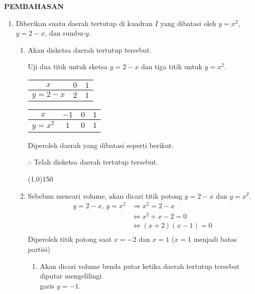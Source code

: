 \begin{center}
\textbf{\large{PEMBAHASAN}}
\end{center}
\begin{enumerate}[leftmargin=*, label={\arabic*}.]
\item Diberikan suatu daerah tertutup di kuadran $I$ yang dibatasi oleh $y=x^{2}$, 
$y=2-x$, dan sumbu-$y$.
    \begin{enumerate}[label={\alph*}.]
    \item Akan disketsa daerah tertutup tersebut.
    
    Uji dua titik untuk sketsa $y=2-x$ dan tiga titik untuk $y=x^2$.
    \begin{center}
        \begin{tabular}{|c|c|c|}\hline
            $x$  & $0$ & $1$ \\ \hline
            $y=2-x$ & $2$ & $1$ \\ \hline
        \end{tabular}\quad
        \begin{tabular}{|c|c|c|c|}\hline
            $x$ & $-1$ & $0$ & $1$ \\ \hline
            $y=x^{2}$ & $1$ & $0$ & $1$ \\ \hline
        \end{tabular}
    \end{center}
    Diperoleh daerah yang dibatasi seperti berikut.

    

    $\therefore$ Telah disketsa daerah tertutup tersebut.


\begin{center}\line(1,0){150}\end{center}


    \item Sebelum mencari volume, akan dicari titik potong $y=2-x$ dan $y=x^{2}$.
    \begin{align*}
        y=2-x,\,y=x^{2} &\Longrightarrow x^{2}=2-x\\
        &\iff x^{2}+x-2 = 0\\
        &\iff (x+2)(x-1) = 0\\
    \end{align*}
    Diperoleh titik potong saat $x=-2$ dan $x=1$ ($x=1$ menjadi batas partisi)
        \begin{enumerate}[label={\roman*}.]
        \item Akan dicari volume benda putar ketika daerah tertutup tersebut 
        diputar mengelilingi \\garis $y=-1$.


\end{enumerate}
\end{enumerate}
\end{enumerate}
